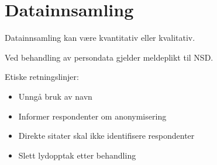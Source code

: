 \chapter{Datainnsamling}

Datainnsamling kan være kvantitativ eller kvalitativ.

Ved behandling av persondata gjelder meldeplikt til NSD.

Etiske retningslinjer:

\begin{itemize}
\item Unngå bruk av navn
\item Informer respondenter om anonymisering
\item Direkte sitater skal ikke identifisere respondenter
\item Slett lydopptak etter behandling
\end{itemize}
